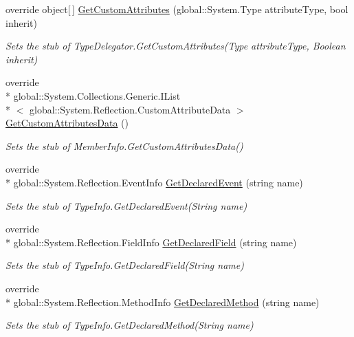\begin{DoxyCompactItemize}
override object\mbox{[}$\,$\mbox{]} \hyperlink{class_system_1_1_reflection_1_1_fakes_1_1_stub_type_delegator_a857c7e8aa3484a795eb1226276885174}{Get\-Custom\-Attributes} (global\-::\-System.\-Type attribute\-Type, bool inherit)
\begin{DoxyCompactList}\small\item\em Sets the stub of Type\-Delegator.\-Get\-Custom\-Attributes(\-Type attribute\-Type, Boolean inherit)\end{DoxyCompactList}\item 
override \\*
global\-::\-System.\-Collections.\-Generic.\-I\-List\\*
$<$ global\-::\-System.\-Reflection.\-Custom\-Attribute\-Data $>$ \hyperlink{class_system_1_1_reflection_1_1_fakes_1_1_stub_type_delegator_a921f82bc7fade458a7b31527ac4ca513}{Get\-Custom\-Attributes\-Data} ()
\begin{DoxyCompactList}\small\item\em Sets the stub of Member\-Info.\-Get\-Custom\-Attributes\-Data()\end{DoxyCompactList}\item 
override \\*
global\-::\-System.\-Reflection.\-Event\-Info \hyperlink{class_system_1_1_reflection_1_1_fakes_1_1_stub_type_delegator_ad208da39d679761751d8f541c080a018}{Get\-Declared\-Event} (string name)
\begin{DoxyCompactList}\small\item\em Sets the stub of Type\-Info.\-Get\-Declared\-Event(\-String name)\end{DoxyCompactList}\item 
override \\*
global\-::\-System.\-Reflection.\-Field\-Info \hyperlink{class_system_1_1_reflection_1_1_fakes_1_1_stub_type_delegator_af2adad7d635d63e1791d801003a871f3}{Get\-Declared\-Field} (string name)
\begin{DoxyCompactList}\small\item\em Sets the stub of Type\-Info.\-Get\-Declared\-Field(\-String name)\end{DoxyCompactList}\item 
override \\*
global\-::\-System.\-Reflection.\-Method\-Info \hyperlink{class_system_1_1_reflection_1_1_fakes_1_1_stub_type_delegator_aa28a551202e16c3c50049b76ddca4f57}{Get\-Declared\-Method} (string name)
\begin{DoxyCompactList}\small\item\em Sets the stub of Type\-Info.\-Get\-Declared\-Method(\-String name)\end{DoxyCompactList}\item 

\end{DoxyCompactItemize}
